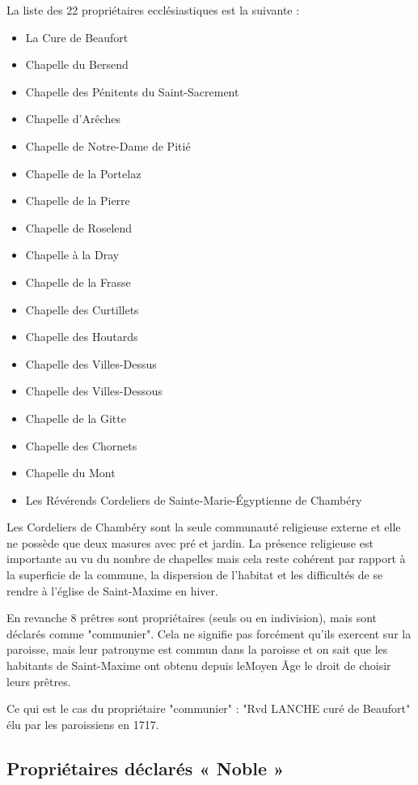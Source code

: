 \documentclass[12pt,a4paper]{report}
\begin{document}
	La liste des 22 propriétaires ecclésiastiques est la suivante :
	
	\begin{itemize}
		\item La Cure de Beaufort
		\item Chapelle du Bersend
		\item Chapelle des Pénitents du Saint-Sacrement
		\item Chapelle d'Arêches
		\item Chapelle de Notre-Dame de Pitié
		\item Chapelle de la Portelaz
		\item Chapelle de la Pierre
		\item Chapelle de Roselend
		\item Chapelle à la Dray
		\item Chapelle de la Frasse
		\item Chapelle des Curtillets
		\item Chapelle des Houtards
		\item Chapelle des Villes-Dessus
		\item Chapelle des Villes-Dessous
		\item Chapelle de la Gitte
		\item Chapelle des Chornets
		\item Chapelle du Mont
		\item Les Révérends Cordeliers de Sainte-Marie-Égyptienne de Chambéry
	\end{itemize}
	
	Les Cordeliers de Chambéry sont la seule communauté religieuse externe et elle ne possède que deux masures avec pré et jardin.
	La présence religieuse est importante au vu du nombre de chapelles mais cela reste cohérent par rapport à la superficie de la commune, la dispersion de l’habitat et les difficultés de se rendre à l’église de Saint-Maxime en hiver.
	
	En revanche 8 prêtres sont propriétaires (seuls ou en indivision), mais sont déclarés comme "communier". Cela ne signifie pas forcément qu'ils exercent sur la paroisse, mais leur patronyme est commun dans la paroisse et on sait que les habitants de Saint-Maxime ont obtenu depuis leMoyen Âge le droit de choisir leurs prêtres.
	
	Ce qui est le cas du propriétaire "communier" : "Rvd LANCHE curé de Beaufort" élu par les paroissiens en 1717.
	
	
	\subsection{Propriétaires déclarés « Noble »}
	
\end{document}
